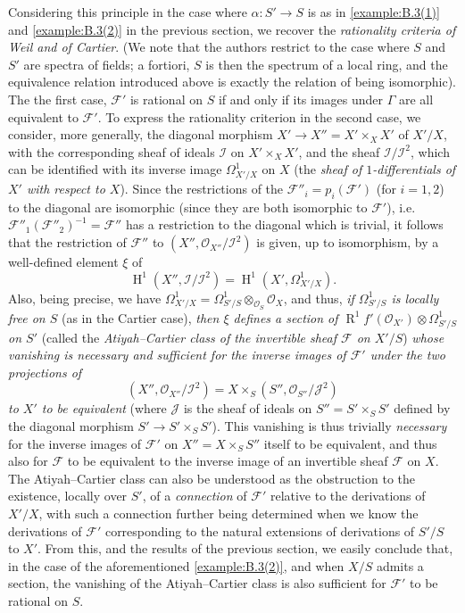 \documentclass{article}
\theoremstyle{plain}
\theoremstyle{definition}
\newcommand{\sh}[1]{{\mathscr{#1}}}
\DeclareMathOperator{\HH}{H}
\DeclareMathOperator{\RR}{R}
\newcommand{\oldpage}[1]{\marginpar{\footnotesize$\Big\vert$ \textit{p.~#1}}}
\begin{document}
Considering this principle in the case where $\alpha\colon S'\to S$ is as in \cref{example:B.3(1)} and \cref{example:B.3(2)} in the previous section, we recover the \emph{rationality criteria of Weil and of Cartier}.
(We note that the authors restrict to the case where $S$ and $S'$
\oldpage{190-25}
are spectra of fields;
a fortiori, $S$ is then the spectrum of a local ring, and the equivalence relation introduced above is exactly the relation of being isomorphic).
The the first case, $\sh{F}'$ is rational on $S$ if and only if its images under $\Gamma$ are all equivalent to $\sh{F}'$.
To express the rationality criterion in the second case, we consider, more generally, the diagonal morphism $X'\to X''=X'\times_X X'$ of $X'/X$, with the corresponding sheaf of ideals $\sh{I}$ on $X'\times_X X'$, and the sheaf $\sh{I}/\sh{I}^2$, which can be identified with its inverse image $\Omega_{X'/X}^1$ on $X$ (the \emph{sheaf of $1$-differentials of $X'$ with respect to $X$}).
Since the restrictions of the $\sh{F}''_i=p_i(\sh{F}')$ (for $i=1,2$) to the diagonal are isomorphic (since they are both isomorphic to $\sh{F}'$), i.e. $\sh{F}''_1(\sh{F}''_2)^{-1}=\sh{F}''$ has a restriction to the diagonal which is trivial, it follows that the restriction of $\sh{F}''$ to $(X'',\sh{O}_{X''}/\sh{I}^2)$ is given, up to isomorphism, by a well-defined element $\xi$ of
\[
  \HH^1(X'',\sh{I}/\sh{I}^2) = \HH^1(X',\Omega_{X'/X}^1).
\]
Also, being precise, we have $\Omega_{X'/X}^1=\Omega_{S'/S}^1\otimes_{\sh{O}_S}\sh{O}_X$, and thus, \emph{if $\Omega_{S'/S}^1$ is locally free on $S$} (as in the Cartier case), \emph{then $\xi$ defines a section of $\RR^1f'(\sh{O}_{X'})\otimes\Omega_{S'/S}^1$ on $S'$} (called the \emph{Atiyah--Cartier class of the invertible sheaf $\sh{F}$ on $X'/S$}) \emph{whose vanishing is necessary and sufficient for the inverse images of $\sh{F}'$ under the two projections of}
\[
  (X'',\sh{O}_{X''}/\sh{I}^2) = X\times_S(S'',\sh{O}_{S''}/\sh{J}^2)
\]
\emph{to $X'$ to be equivalent} (where $\sh{J}$ is the sheaf of ideals on $S''=S'\times_S S'$ defined by the diagonal morphism $S'\to S'\times_S S'$).
This vanishing is thus trivially \emph{necessary} for the inverse images of $\sh{F}'$ on $X''=X\times_S S''$ itself to be equivalent, and thus also for $\sh{F}$ to be equivalent to the inverse image of an invertible sheaf $\sh{F}$ on $X$.
The Atiyah--Cartier class can also be understood as the obstruction to the existence, locally over $S'$, of a \emph{connection} of $\sh{F}'$ relative to the derivations of $X'/X$, with such a connection further being determined when we know the derivations of $\sh{F}'$ corresponding to the natural extensions of derivations of $S'/S$ to $X'$.
From this, and the results of the previous section, we easily conclude that, in the case of the aforementioned \cref{example:B.3(2)}, and when $X/S$ admits a section, the vanishing of the Atiyah--Cartier class is also sufficient for $\sh{F}'$ to be rational on $S$.
\end{document}
